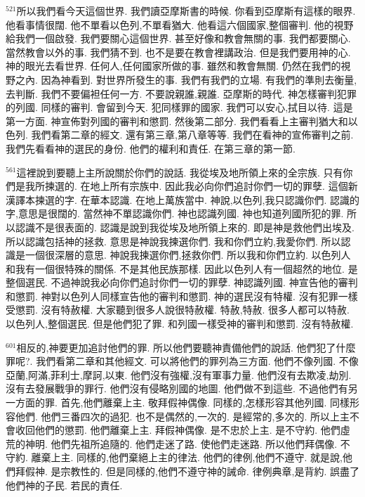 \documentclass{book}
\begin{document}
$^{521}$所以我們看今天這個世界.
我們讀亞摩斯書的時候.
你看到亞摩斯有這樣的眼界.
他看事情很闊.
他不單看以色列,不單看猶大.
他看這六個國家,整個審判.
他的視野給我們一個啟發.
我們要關心這個世界.
甚至好像和教會無關的事.
我們都要關心.
當然教會以外的事.
我們猜不到.
也不是要在教會裡講政治.
但是我們要用神的心.
神的眼光去看世界.
任何人,任何國家所做的事.
雖然和教會無關.
仍然在我們的視野之內.
因為神看到.
對世界所發生的事.
我們有我們的立場.
有我們的準則去衡量,去判斷.
我們不要偏袒任何一方.
不要說親誰,親誰.
亞摩斯的時代.
神怎樣審判犯罪的列國.
同樣的審判.
會留到今天.
犯同樣罪的國家.
我們可以安心,拭目以待.
這是第一方面.
神宣佈對列國的審判和懲罰.
然後第二部分.
我們看看上主審判猶大和以色列.
我們看第二章的經文.
還有第三章,第八章等等.
我們在看神的宣佈審判之前.
我們先看看神的選民的身份.
他們的權利和責任.
在第三章的第一節.

$^{561}$這裡說到要聽上主所說關於你們的說話.
我從埃及地所領上來的全宗族.
只有你們是我所揀選的.
在地上所有宗族中.
因此我必向你們追討你們一切的罪孽.
這個新漢譯本揀選的字.
在華本認識.
在地上萬族當中.
神說,以色列,我只認識你們.
認識的字,意思是很闊的.
當然神不單認識你們.
神也認識列國.
神也知道列國所犯的罪.
所以認識不是很表面的.
認識是說到我從埃及地所領上來的.
即是神是救他們出埃及.
所以認識包括神的拯救.
意思是神說我揀選你們.
我和你們立約,我愛你們.
所以認識是一個很深層的意思.
神說我揀選你們,拯救你們.
所以我和你們立約.
以色列人和我有一個很特殊的關係.
不是其他民族那樣.
因此以色列人有一個超然的地位.
是整個選民.
不過神說我必向你們追討你們一切的罪孽.
神認識列國.
神宣告他的審判和懲罰.
神對以色列人同樣宣告他的審判和懲罰.
神的選民沒有特權.
沒有犯罪一樣受懲罰.
沒有特赦權.
大家聽到很多人說很特赦權.
特赦,特赦.
很多人都可以特赦.
以色列人,整個選民.
但是他們犯了罪.
和列國一樣受神的審判和懲罰.
沒有特赦權.

$^{601}$相反的,神要更加追討他們的罪.
所以他們要聽神責備他們的說話.
他們犯了什麼罪呢?.
我們看第二章和其他經文.
可以將他們的罪列為三方面.
他們不像列國.
不像亞蘭,阿滿,菲利士,摩訶,以東.
他們沒有強權,沒有軍事力量.
他們沒有去欺凌,劫別.
沒有去發展戰爭的罪行.
他們沒有侵略別國的地圖.
他們做不到這些.
不過他們有另一方面的罪.
首先,他們離棄上主.
敬拜假神偶像.
同樣的,怎樣形容其他列國.
同樣形容他們.
他們三番四次的過犯.
也不是偶然的,一次的.
是經常的,多次的.
所以上主不會收回他們的懲罰.
他們離棄上主.
拜假神偶像.
是不忠於上主.
是不守約.
他們虛荒的神明.
他們先祖所追隨的.
他們走迷了路.
使他們走迷路.
所以他們拜偶像.
不守約.
離棄上主.
同樣的,他們棄絕上主的律法.
他們的律例,他們不遵守.
就是說,他們拜假神.
是宗教性的.
但是同樣的,他們不遵守神的誡命.
律例典章,是背約.
誤盡了他們神的子民.
若民的責任.
\end{document}
